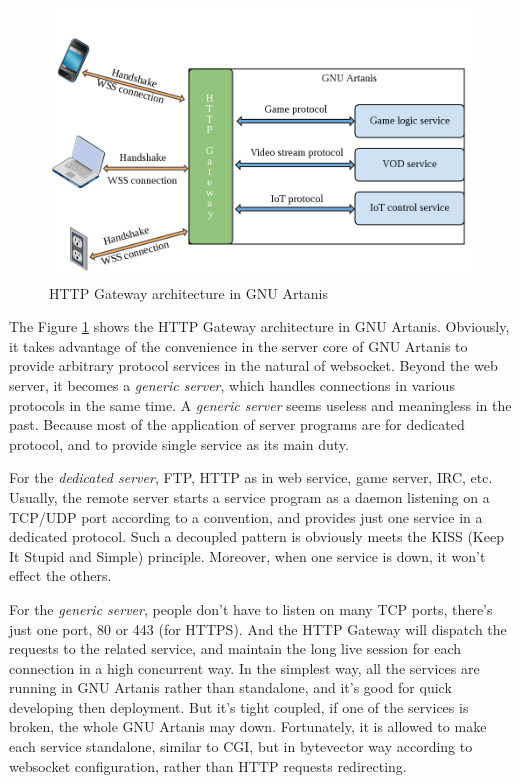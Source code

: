 \documentclass[numbers,numberedpars]{sigplanconf}
\begin{document}
\begin{figure}[tbph]
  \centering
  \includegraphics[scale=0.25]{httpgw.png}
  \caption{HTTP Gateway architecture in GNU Artanis}
  \label{fig:httpgw}
\end{figure}

The Figure \ref{fig:httpgw} shows the HTTP Gateway architecture in GNU Artanis.
Obviously, it takes advantage of the convenience in the server core of GNU Artanis to provide arbitrary protocol services in the
natural of websocket. Beyond the web server, it becomes a {\it generic server}, which handles connections in various protocols in the
same time. A {\it generic server} seems useless and meaningless in the past. Because most of the application of server programs are for
dedicated protocol, and to provide single service as its main duty.

For the {\it dedicated server}, FTP, HTTP as in web service, game server, IRC, etc. Usually, the remote server starts a service program
as a daemon listening on a TCP/UDP port according to a convention, and provides just one service in a dedicated protocol. Such a decoupled
pattern is obviously meets the KISS (Keep It Stupid and Simple) principle. Moreover, when one service is down, it won't effect the others.

For the {\it generic server}, people don't have to listen on many TCP ports, there's just one port, 80 or 443 (for HTTPS). And the HTTP
Gateway will dispatch the requests to the related service, and maintain the long live session for each connection in a high concurrent way.
In the simplest way, all the services are running in GNU Artanis rather than standalone, and it's good for quick developing then deployment.
But it's tight coupled, if one of the services is broken, the whole GNU Artanis may down. Fortunately, it is allowed to make each service
standalone, similar to CGI, but in bytevector way according to websocket configuration, rather than HTTP requests redirecting.
\end{document}
